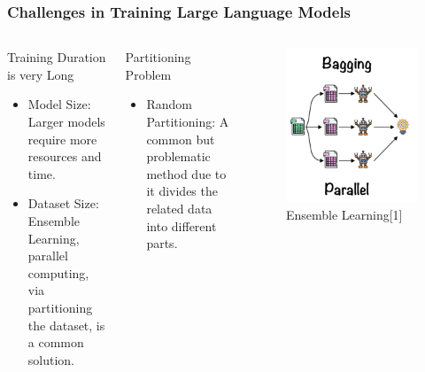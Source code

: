 \documentclass[11pt]{beamer}
\begin{document}

\begin{frame}
    \frametitle{Challenges in Training Large Language Models}
    \begin{columns}[T,onlytextwidth]
        \begin{block}{Training Duration is very Long}
            \begin{itemize}
                \item Model Size: Larger models require more resources and time.
                \item Dataset Size: Ensemble Learning, parallel computing, via partitioning the dataset, is a common solution.
            \end{itemize}
        \end{block}
    
        \begin{block}{Partitioning Problem}
            \begin{itemize}
                \item Random Partitioning: A common but problematic method due to it divides the related data into different parts.
            \end{itemize}
        \end{block}

        \begin{figure}
            \includegraphics[width=\textwidth]{esb.png}
            \caption{Ensemble Learning[1]}
        \end{figure}
    \end{columns}


\end{frame}
\end{document}
